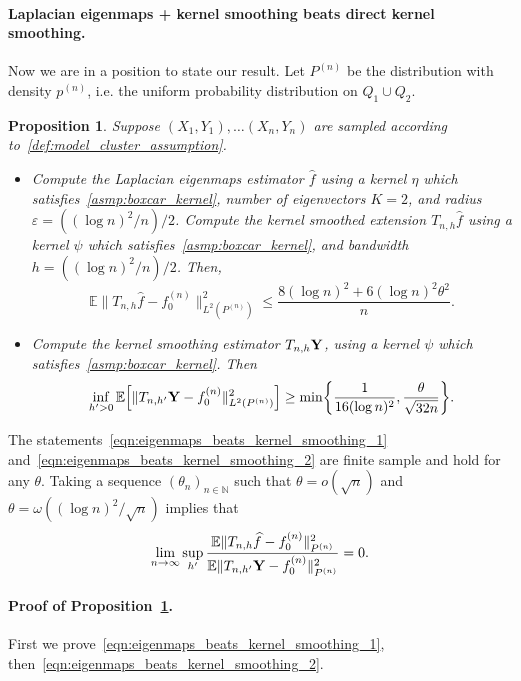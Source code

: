 \documentclass[aos]{imsart}
\theoremstyle{plain}
\newtheorem{proposition}{Proposition}
\theoremstyle{definition}
\theoremstyle{remark}
\newcommand{\Ebb}{\mathbb{E}}
\newcommand{\wh}[1]{\widehat{#1}}
\newcommand{\1}{\mathbf{1}}
\begin{document}
\paragraph{Laplacian eigenmaps + kernel smoothing beats direct kernel smoothing.}
Now we are in a position to state our result. Let $P^{(n)}$ be the distribution with density $p^{(n)}$, i.e. the uniform probability distribution on $Q_1 \cup Q_2$. 
\begin{proposition}
	\label{prop:eigenmaps_beats_kernel_smoothing}
	Suppose $(X_1,Y_1),\ldots(X_n,Y_n)$ are sampled according to~\eqref{def:model_cluster_assumption}. 
	\begin{itemize}
		\item Compute the Laplacian eigenmaps estimator $\wh{f}$ using a kernel $\eta$ which satisfies~\eqref{asmp:boxcar_kernel}, number of eigenvectors $K = 2$, and radius $\varepsilon = ((\log n)^2/n)/2$. Compute the kernel smoothed extension $T_{n,h}\wh{f}$ using a kernel $\psi$ which satisfies~\eqref{asmp:boxcar_kernel}, and bandwidth $h = ((\log n)^2/n)/2$. Then,
		\begin{equation}
		\label{eqn:eigenmaps_beats_kernel_smoothing_1}
		\Ebb \|T_{n,h}\wh{f} - f_0^{(n)}\|_{L^2(P^{(n)})}^2 \leq \frac{8 (\log n)^2 + 6 (\log n)^2 \theta^2}{n}.
		\end{equation}
		\item Compute the kernel smoothing estimator $T_{n,h}{\bf Y}$, using a kernel $\psi$ which satisfies~\eqref{asmp:boxcar_kernel}. Then
		\begin{equation}
		\label{eqn:eigenmaps_beats_kernel_smoothing_2}
		\inf_{h' > 0} \Ebb\Bigl[\|T_{n,h'}{\bf Y} - f_0^{(n)}\|_{L^2(P^{(n)})}^2\Bigr] \geq \min\biggl\{ \frac{1}{16(\log n)^2}, \frac{\theta}{\sqrt{32 n}} \biggr\}.
		\end{equation}
	\end{itemize}
\end{proposition}
The statements~\eqref{eqn:eigenmaps_beats_kernel_smoothing_1} and~\eqref{eqn:eigenmaps_beats_kernel_smoothing_2} are finite sample and hold for any $\theta$. Taking a sequence $(\theta_n)_{n \in \mathbb{N}}$ such that $\theta = o(\sqrt{n})$ and $\theta = \omega((\log n)^2/\sqrt{n})$ implies that 
\begin{equation*}
\lim_{n \to \infty} \sup_{h'}  \frac{\Ebb \|T_{n,h}\wh{f} - f_0^{(n)}\|_{P^{(n)}}^2}{	\Ebb \|T_{n,h'}{\bf Y} - f_0^{(n)}\|_{P^{(n)}}^2 } = 0.
\end{equation*}

\paragraph{Proof of Proposition~\ref{prop:eigenmaps_beats_kernel_smoothing}.}
First we prove~\eqref{eqn:eigenmaps_beats_kernel_smoothing_1}, then~\eqref{eqn:eigenmaps_beats_kernel_smoothing_2}.
\end{document}
